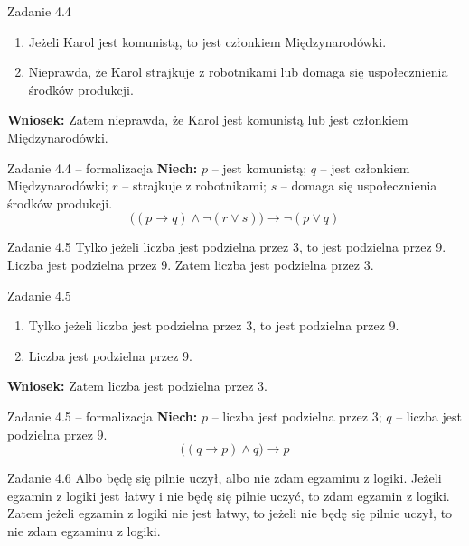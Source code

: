 \documentclass[12pt]{beamer}
\begin{document}
\begin{frame}{Zadanie 4.4}
\begin{enumerate}
    \item[P1.] Jeżeli Karol jest komunistą, to jest członkiem Międzynarodówki.
    \item[P2.] Nieprawda, że Karol strajkuje z robotnikami lub domaga się uspołecznienia środków produkcji.
\end{enumerate}
\vspace{6pt}
\textbf{Wniosek:} Zatem nieprawda, że Karol jest komunistą lub jest członkiem Międzynarodówki.
\end{frame}

\begin{frame}{Zadanie 4.4 -- formalizacja}
\textbf{Niech:} $p$ -- jest komunistą; $q$ -- jest członkiem Międzynarodówki; $r$ -- strajkuje z robotnikami; $s$ -- domaga się uspołecznienia środków produkcji.
\vspace{10pt}
\[ \big((p \rightarrow q) \wedge \neg(r \vee s)\big) \rightarrow \neg(p \vee q) \]
\end{frame}

\begin{frame}{Zadanie 4.5}
Tylko jeżeli liczba jest podzielna przez 3, to jest podzielna przez 9. Liczba jest podzielna przez 9. Zatem liczba jest podzielna przez 3.
\end{frame}

\begin{frame}{Zadanie 4.5}
\begin{enumerate}
    \item[P1.] Tylko jeżeli liczba jest podzielna przez 3, to jest podzielna przez 9.
    \item[P2.] Liczba jest podzielna przez 9.
\end{enumerate}
\vspace{6pt}
\textbf{Wniosek:} Zatem liczba jest podzielna przez 3.
\end{frame}

\begin{frame}{Zadanie 4.5 -- formalizacja}
\textbf{Niech:} $p$ -- liczba jest podzielna przez 3; $q$ -- liczba jest podzielna przez 9.
\vspace{10pt}
\[ \big((q \rightarrow p) \wedge q\big) \rightarrow p \]
\end{frame}

\begin{frame}{Zadanie 4.6}
Albo będę się pilnie uczył, albo nie zdam egzaminu z logiki. Jeżeli egzamin z logiki jest łatwy i nie będę się pilnie uczyć, to zdam egzamin z logiki. Zatem jeżeli egzamin z logiki nie jest łatwy, to jeżeli nie będę się pilnie uczył, to nie zdam egzaminu z logiki.
\end{frame}
\end{document}
